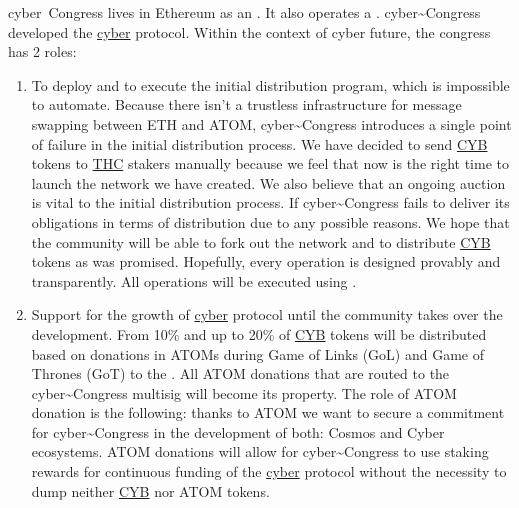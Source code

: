 \documentclass[8pt,oneside]{amsart}
\newcommand{\linkgreen}[2]{\href{#1}{\color{green}{#2}}}
\begin{document}
cyber~Congress lives in Ethereum as an \linkgreen{https://mainnet.aragon.org/#/cybercongress/0x4feb2bcc5907e7779130c093eef8fb44502c1330/}{Aragon DAO}. It also operates a \linkgreen{https://cyber.page/network/cyber/contract/cyber1latzme6xf6s8tsrymuu6laf2ks2humqvdq39v8}{2-of-3 multisig in Cyber network}. cyber\~{}Congress developed the {\hyperref[cyber]{cyber}} protocol. Within the context of cyber future, the congress has 2 roles:
\begin{enumerate}
 \item To deploy and to execute the initial distribution program, which is impossible to automate. Because there isn't a trustless infrastructure for message swapping between ETH and ATOM, cyber\~{}Congress introduces a single point of failure in the initial distribution process. We have decided to send {\hyperref[cyb]{CYB}} tokens to {\hyperref[thc]{THC}} stakers manually because we feel that now is the right time to launch the network we have created. We also believe that an ongoing auction is vital to the initial distribution process. If cyber\~{}Congress fails to deliver its obligations in terms of distribution due to any possible reasons. We hope that the community will be able to fork out the network and to distribute {\hyperref[cyb]{CYB}} tokens as was promised. Hopefully, every operation is designed provably and transparently. All operations will be executed using \linkgreen{
https://cyber.page/network/cyber/contract/cyber147drnke9676972jr3anklkj7pzgwjw47cp2u7j}{special purpose 2-of-3 multisig account in Cyber network}.
 \item Support for the growth of {\hyperref[cyber]{cyber}} protocol until the community takes over the development. From 10\% and up to 20\% of {\hyperref[cyb]{CYB}} tokens will be distributed based on donations in ATOMs during Game of Links (GoL) and Game of Thrones (GoT) to the \linkgreen{
https://www.mintscan.io/account/cosmos1latzme6xf6s8tsrymuu6laf2ks2humqv2tkd9a}{cyber\~{}Congress Cosmos 2-of-3 multisig}. All ATOM donations that are routed to the cyber\~{}Congress multisig will become its property. The role of ATOM donation is the following: thanks to ATOM we want to secure a commitment for cyber\~{}Congress in the development of both: Cosmos and Cyber ecosystems. ATOM donations will allow for cyber\~{}Congress to use staking rewards for continuous funding of the {\hyperref[cyber]{cyber}} protocol without the necessity to dump neither {\hyperref[cyb]{CYB}} nor ATOM tokens.
\end{enumerate}
\end{document}
